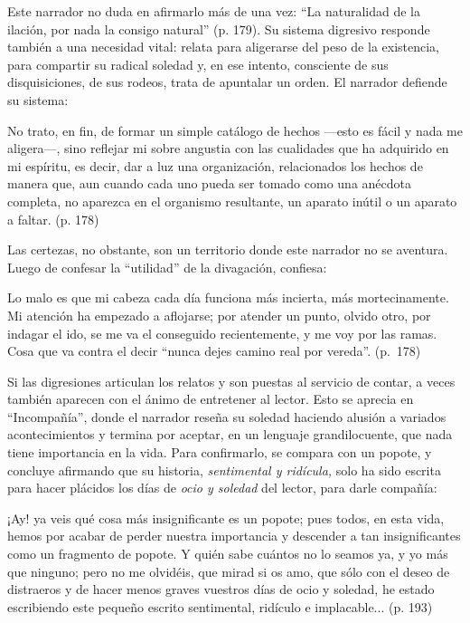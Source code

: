 \documentclass[14pt,twoside,final]{extbook} %
\begin{document}
Este narrador no duda en afirmarlo más de una vez: ``La naturalidad de la ilación, por nada la consigo natural'' (p. 179). Su sistema digresivo responde también a una necesidad vital: relata para
aligerarse del peso de la existencia, para compartir su radical soledad y, en ese intento, consciente de sus disquisiciones, de sus rodeos, trata de apuntalar un orden. El narrador defiende su sistema:
\begin{quoting}
No trato, en fin, de formar un simple catálogo de hechos ---esto es fácil y nada me aligera---, sino reflejar mi sobre angustia con las cualidades que ha adquirido en mi espíritu, es decir, dar a luz una organización, relacionados los hechos de manera que, aun cuando cada uno pueda ser tomado como una anécdota completa, no aparezca en el organismo resultante, un aparato inútil o un aparato a faltar. (p. 178)
\end{quoting}
Las certezas, no obstante, son un territorio donde este narrador no se aventura. Luego de confesar la ``utilidad'' de la divagación, confiesa:
\begin{quoting}
Lo malo es que mi cabeza cada día funciona más incierta, más mortecinamente. Mi atención ha empezado a aflojarse; por atender un punto, olvido otro, por indagar el ido, se me va el conseguido recientemente, y me voy por las ramas. Cosa que va contra el decir ``nunca dejes camino real por vereda''. (p.~178)
\end{quoting}
Si las digresiones articulan los relatos y son puestas al servicio de contar, a veces también aparecen con el ánimo de entretener al lector. Esto se aprecia en ``Incompañía'', donde el narrador reseña su soledad haciendo alusión a variados acontecimientos y termina por aceptar, en un lenguaje grandilocuente, que nada tiene importancia en la vida. Para confirmarlo, se compara con un popote, y concluye afirmando que su historia, \emph{sentimental y ridícula,} solo ha sido escrita para hacer plácidos los días de \emph{ocio y soledad} del lector, para darle compañía:
\begin{quoting}
¡Ay! ya veis qué cosa más insignificante es un popote; pues todos, en esta vida, hemos por acabar de perder nuestra importancia y descender a tan insignificantes como un fragmento de popote. Y quién sabe cuántos no lo seamos ya, y yo más que ninguno; pero no me olvidéis, que mirad si os amo, que sólo con el deseo de distraeros y de hacer menos graves vuestros días de ocio y soledad, he estado
escribiendo este pequeño escrito sentimental, ridículo e implacable... (p. 193)
\end{quoting}
\end{document}

